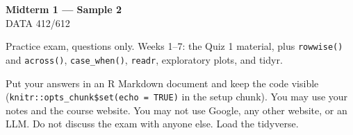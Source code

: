 \documentclass[11pt]{article}
\begin{document}
\begin{center}
{\LARGE\bfseries Midterm 1 --- Sample 2}\\[0.35em]
DATA 412/612
\end{center}

\vspace{0.25em}

Practice exam, questions only. Weeks 1--7: the Quiz 1 material,
plus \texttt{rowwise()} and \texttt{across()}, \texttt{case\_when()},
\texttt{readr}, exploratory plots, and tidyr.

Put your answers in an R Markdown document and keep the code visible
(\texttt{knitr::opts\_chunk\$set(echo = TRUE)} in the setup chunk).
You may use your notes and the course website.
You may not use Google, any other website, or an LLM.
Do not discuss the exam with anyone else.
Load the tidyverse.
\end{document}
